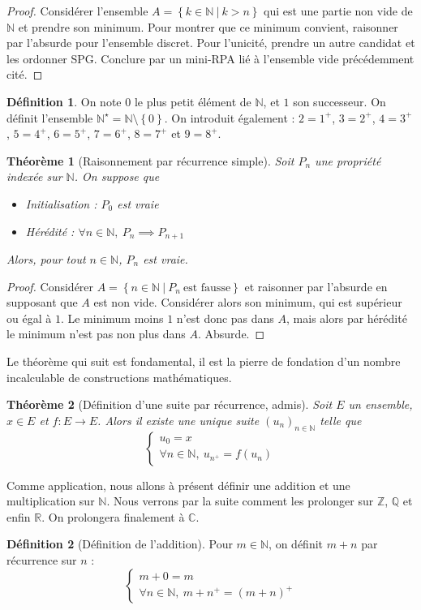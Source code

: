 \documentclass[french]{book}
\newcommand{\N}{\mathbb{N}}
\newcommand{\Z}{\mathbb{Z}}
\newcommand{\Q}{\mathbb{Q}}
\newcommand{\R}{\mathbb{R}}
\newcommand{\C}{\mathbb{C}}
\newcommand{\st}{^\star}
\theoremstyle{plain}
\newtheorem{thm}{Théorème}[chapter]
\theoremstyle{definition}
\newtheorem{dfn}{Définition}[chapter]
\theoremstyle{remark}
\begin{document}
\begin{proof}
	Considérer l'ensemble $A=\left\{k\in\N\ | \ k>n\right\}$ qui est une partie non vide de $\N$ et prendre son minimum. Pour montrer que ce minimum convient, raisonner par l'absurde pour l'ensemble discret. Pour l'unicité, prendre un autre candidat et les ordonner SPG. Conclure par un mini-RPA lié à l'ensemble vide précédemment cité.
\end{proof}
\begin{dfn}
	On note $0$ le plus petit élément de $\N$, et $1$ son successeur. On définit l'ensemble $\N\st=\N\setminus\left\{0\right\}$. On introduit également : $2=1^+$, $3=2^+$, $4=3^+$, $5=4^+$, $6=5^+$, $7=6^+$, $8=7^+$ et $9=8^+$.
\end{dfn}
\begin{thm}[Raisonnement par récurrence simple]
	Soit $P_n$ une propriété indexée sur $\N$. On suppose que \begin{itemize}
		\item Initialisation : $P_0$ est vraie
		\item Hérédité : $\forall n\in\N,\ P_n\implies P_{n+1}$
	\end{itemize}
	Alors, pour tout $n\in\N$, $P_n$ est vraie.
\end{thm}
\begin{proof}
	Considérer $A=\left\{n\in\N\ | \ P_n \ \text{est fausse}\right\}$ et raisonner par l'absurde en supposant que $A$ est non vide. Considérer alors son minimum, qui est supérieur ou égal à $1$. Le minimum moins $1$ n'est donc pas dans $A$, mais alors par hérédité le minimum n'est pas non plus dans $A$. Absurde.
\end{proof}
Le théorème qui suit est fondamental, il est la pierre de fondation d'un nombre incalculable de constructions mathématiques.
\begin{thm}[Définition d'une suite par récurrence, admis]
	Soit $E$ un ensemble, $x\in E$ et $f:E\rightarrow E$. Alors il existe une unique suite $(u_n)_{n\in\N}$ telle que $$\left \{ \begin{array}{ll}u_0=x \\ \forall n\in\N,\ u_{n^+}=f(u_n) \end{array} \right.$$
\end{thm}
Comme application, nous allons à présent définir une addition et une multiplication sur $\N$. Nous verrons par la suite comment les prolonger sur $\Z$, $\Q$ et enfin $\R$. On prolongera finalement à $\C$.
\begin{dfn}[Définition de l'addition]
	Pour $m\in\N$, on définit $m+n$ par récurrence sur $n$ : $$\left \{ \begin{array}{ll}
		m+0=m \\ \forall n\in\N,\ m+n^+=(m+n)^+
	\end{array} \right.$$
\end{dfn}
\end{document}
